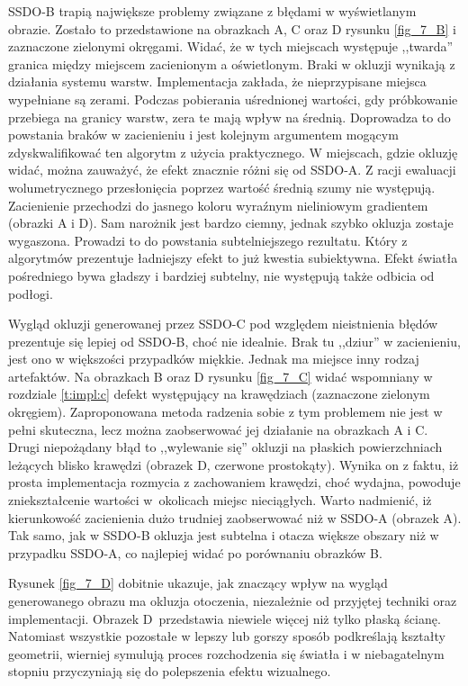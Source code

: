 		SSDO-B trapią największe problemy związane z błędami w wyświetlanym obrazie. Zostało to przedstawione na obrazkach A, C oraz D rysunku \ref{fig_7_B} i zaznaczone zielonymi okręgami. Widać, że w tych miejscach występuje ,,twarda'' granica między miejscem zacienionym a oświetlonym. Braki w okluzji wynikają z działania systemu warstw. Implementacja zakłada, że nieprzypisane miejsca wypełniane są zerami. Podczas pobierania uśrednionej wartości, gdy próbkowanie przebiega na granicy warstw, zera te mają wpływ na średnią. Doprowadza to do powstania braków w zacienieniu i jest kolejnym argumentem mogącym zdyskwalifikować ten algorytm z użycia praktycznego. W miejscach, gdzie okluzję widać, można zauważyć, że efekt znacznie różni się od SSDO-A. Z racji ewaluacji wolumetrycznego przesłonięcia poprzez wartość średnią szumy nie występują. Zacienienie przechodzi do jasnego koloru wyraźnym nieliniowym gradientem (obrazki A i D). Sam narożnik jest bardzo ciemny, jednak szybko okluzja zostaje wygaszona. Prowadzi to do powstania subtelniejszego rezultatu. Który z algorytmów prezentuje ładniejszy efekt to już kwestia subiektywna. Efekt światła pośredniego bywa gładszy i bardziej subtelny, nie występują także odbicia od podłogi.
		
		Wygląd okluzji generowanej przez SSDO-C pod względem nieistnienia błędów prezentuje się lepiej od SSDO-B, choć nie idealnie. Brak tu ,,dziur'' w zacienieniu, jest ono w większości przypadków miękkie. Jednak ma miejsce inny rodzaj artefaktów. Na obrazkach B oraz D rysunku \ref{fig_7_C} widać wspomniany w rozdziale \ref{t:impl:c} defekt występujący na krawędziach (zaznaczone zielonym okręgiem). Zaproponowana metoda radzenia sobie z tym problemem nie jest w pełni skuteczna, lecz można zaobserwować jej działanie na obrazkach A i C. Drugi niepożądany błąd to ,,wylewanie się'' okluzji na płaskich powierzchniach leżących blisko krawędzi (obrazek D, czerwone prostokąty). Wynika on z faktu, iż prosta implementacja rozmycia z zachowaniem krawędzi, choć wydajna, powoduje zniekształcenie wartości w~okolicach miejsc nieciągłych. Warto nadmienić, iż kierunkowość zacienienia dużo trudniej zaobserwować niż w SSDO-A (obrazek A).
		Tak samo, jak w SSDO-B okluzja jest subtelna i otacza większe obszary niż w przypadku SSDO-A, co najlepiej widać po porównaniu obrazków B.
		
		Rysunek \ref{fig_7_D} dobitnie ukazuje, jak znaczący wpływ na wygląd generowanego obrazu ma okluzja otoczenia, niezależnie od przyjętej techniki oraz implementacji. Obrazek D~przedstawia niewiele więcej niż tylko płaską ścianę. Natomiast wszystkie pozostałe w lepszy lub gorszy sposób podkreślają kształty geometrii, wierniej symulują proces rozchodzenia się światła i w niebagatelnym stopniu przyczyniają się do polepszenia efektu wizualnego.
	
